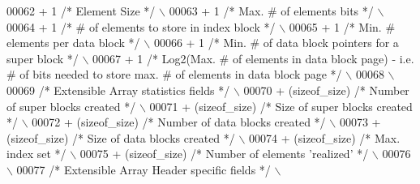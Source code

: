 \begin{DoxyCode}
00062 \textcolor{preprocessor}{    + 1 }\textcolor{comment}{/* Element Size */}\textcolor{preprocessor}{                                                    \(\backslash\)}
00063 \textcolor{preprocessor}{    + 1 }\textcolor{comment}{/* Max. # of elements bits */}\textcolor{preprocessor}{                                         \(\backslash\)}
00064 \textcolor{preprocessor}{    + 1 }\textcolor{comment}{/* # of elements to store in index block */}\textcolor{preprocessor}{                           \(\backslash\)}
00065 \textcolor{preprocessor}{    + 1 }\textcolor{comment}{/* Min. # elements per data block */}\textcolor{preprocessor}{                                  \(\backslash\)}
00066 \textcolor{preprocessor}{    + 1 }\textcolor{comment}{/* Min. # of data block pointers for a super block */}\textcolor{preprocessor}{                 \(\backslash\)}
00067 \textcolor{preprocessor}{    + 1 }\textcolor{comment}{/* Log2(Max. # of elements in data block page) - i.e. # of bits needed to store max. # of elements
       in data block page */}\textcolor{preprocessor}{ \(\backslash\)}
00068 \textcolor{preprocessor}{                                                                              \(\backslash\)}
00069 \textcolor{preprocessor}{    }\textcolor{comment}{/* Extensible Array statistics fields */}\textcolor{preprocessor}{                                  \(\backslash\)}
00070 \textcolor{preprocessor}{    + (sizeof\_size) }\textcolor{comment}{/* Number of super blocks created */}\textcolor{preprocessor}{              \(\backslash\)}
00071 \textcolor{preprocessor}{    + (sizeof\_size) }\textcolor{comment}{/* Size of super blocks created */}\textcolor{preprocessor}{                    \(\backslash\)}
00072 \textcolor{preprocessor}{    + (sizeof\_size) }\textcolor{comment}{/* Number of data blocks created */}\textcolor{preprocessor}{                   \(\backslash\)}
00073 \textcolor{preprocessor}{    + (sizeof\_size) }\textcolor{comment}{/* Size of data blocks created */}\textcolor{preprocessor}{                 \(\backslash\)}
00074 \textcolor{preprocessor}{    + (sizeof\_size) }\textcolor{comment}{/* Max. index set */}\textcolor{preprocessor}{                          \(\backslash\)}
00075 \textcolor{preprocessor}{    + (sizeof\_size) }\textcolor{comment}{/* Number of elements 'realized' */}\textcolor{preprocessor}{                   \(\backslash\)}
00076 \textcolor{preprocessor}{                                                                              \(\backslash\)}
00077 \textcolor{preprocessor}{    }\textcolor{comment}{/* Extensible Array Header specific fields */}\textcolor{preprocessor}{                             \(\backslash\)}

\end{DoxyCode}
